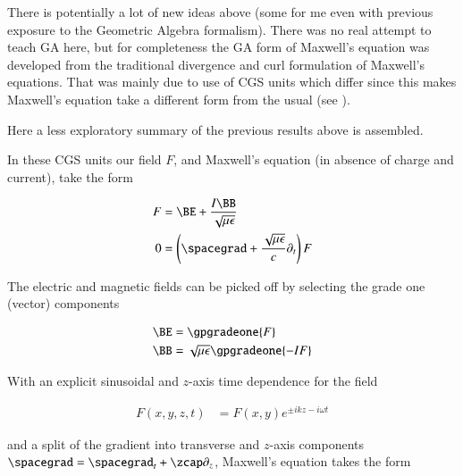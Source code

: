 %
%

There is potentially a lot of new ideas above (some for me even with previous exposure to the Geometric Algebra formalism).  There was no real attempt to teach GA here, but for completeness the GA form of Maxwell's equation was developed from the traditional divergence and curl formulation of Maxwell's equations.  That was mainly due to use of CGS units which differ since this makes Maxwell's equation take a different form from the usual (see \citep{doran2003gap}).

Here a less exploratory summary of the previous results above is assembled.

In these CGS units our field \(F\), and Maxwell's equation (in absence of charge and current), take the form

\begin{equation}\label{eqn:transverseField:foo2}
\begin{aligned}
F &= \BE + \frac{I\BB}{\sqrt{\mu\epsilon}} \\
0 &= \left(\spacegrad + \frac{\sqrt{\mu\epsilon}}{c}\partial_t\right) F
\end{aligned}
\end{equation}

The electric and magnetic fields can be picked off by selecting the grade one (vector) components

\begin{equation}\label{eqn:transverseField:foo8}
\begin{aligned}
\BE &= \gpgradeone{F} \\
\BB &= \sqrt{\mu\epsilon} \gpgradeone{-I F}
\end{aligned}
\end{equation}

With an explicit sinusoidal and \(z\)-axis time dependence for the field

\begin{equation}\label{eqn:transverseField:foo3}
\begin{aligned}
F(x,y,z,t) &= F(x,y) e^{\pm i k z - i \omega t}
\end{aligned}
\end{equation}

and a split of the gradient into transverse and \(z\)-axis components \(\spacegrad = \spacegrad_t + \zcap \partial_z\), Maxwell's equation takes the form

